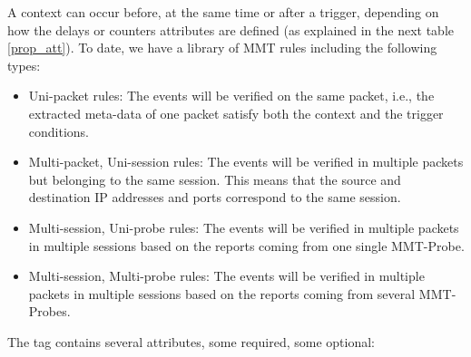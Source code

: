 \note A context can occur before, at the same time or after a
trigger, depending on how the delays or counters attributes are defined (as explained in the next table \ref{prop_att}). To date, we have a library of MMT rules including the following types: 
\begin{itemize}
\item{Uni-packet rules: The events will be verified on the same packet, i.e., the extracted meta-data of one packet satisfy both the context and the trigger conditions.}
\item{Multi-packet, Uni-session rules: The events will be verified in multiple packets but belonging to the same session. This means that the source and destination IP addresses and ports correspond to the same session.}
\item{Multi-session, Uni-probe rules: The events will be verified in multiple packets in multiple sessions based on the reports coming from one single MMT-Probe.}
\item{Multi-session, Multi-probe rules: The events will be verified in multiple packets in multiple sessions based on the reports coming from several MMT-Probes.}
\end{itemize}

 The  tag
contains several attributes, some required, some optional:

